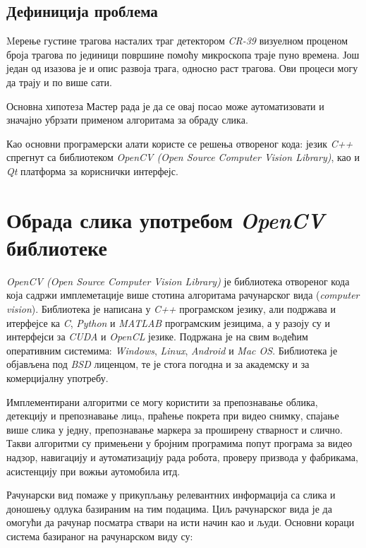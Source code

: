 \documentclass[12pt,a4paper,serbian,oneside]{book}
\begin{document}
\section{Дефиниција проблема}

Mерење густине трагова насталих траг детектором \textit{CR-39} визуелном проценом броја трагова по јединици површине помоћу микроскопа траје пуно времена. Још један од изазова је и опис развоја трага, односно раст трагова. Ови процеси могу да трају и по више сати.

Основна хипотеза Мастер рада је да се овај посао може аутоматизовати и значајно убрзати применом алгоритама за обраду слика. 

Као основни програмерски алати користе се решења отвореног кода:
језик \textit{C++} спрегнут са библиотеком \textit{OpenCV (Open Source Computer Vision Library)}, као и \textit{Qt} платформа за кориснички интерфејс.

%
%
%

\chapter{Обрада слика употребом \textit{OpenCV} библиотеке}

\textit{OpenCV (Open Source Computer Vision Library)} је библиотека отвореног кода која садржи имплеметације више стотина алгоритама рачунарског вида (\textit{computer vision}). Библиотека је написана у \textit{C++} програмском језику, али подржава и итерфејсе ка \textit{C}, \textit{Python} и \textit{MATLAB} програмским језицима, а у разоју су и интерфејси за \textit{CUDA} и \textit{OpenCL} језике. Подржана је на свим вoдећим оперативним системима: \textit{Windows}, \textit{Linux}, \textit{Android} и \textit{Mac OS}. Библиотека је објављена под \textit{BSD} лиценцом, те је стога погодна  и за академску и за комерцијалну употребу.

Имплементирани алгоритми се могу користити за  препознавање облика, детекцију и препознавање лицa, праћење покрета при видео снимку, спајање више слика у једну, препознавање маркера за проширену стварност и слично. Такви алгоритми су примењени у бројним програмима попут програма за видео надзор, навигацију и аутоматизацију рада робота, проверу призвода у фабрикама, асистенцију при вожњи аутомобила итд.

Рачунарски вид помаже у прикупљању релевантних информација са слика и доношењу одлука базираним на тим подацима. Циљ рачунарског вида је да омогући да рачунар посматра ствари на исти начин као и људи. Основни кораци система базираног на рачунарском виду су:
\end{document}
